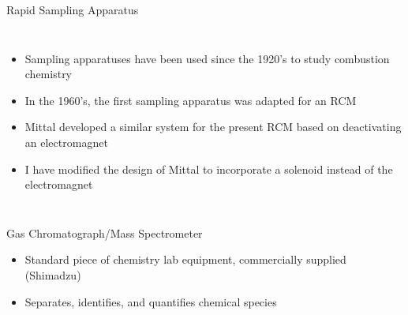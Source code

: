 \documentclass{beamer}
\begin{document}
\begin{frame}{Rapid Sampling Apparatus}
    \begin{columns}
        \begin{minipage}[c][0.6\textheight][c]{\linewidth}
            \begin{itemize}
                \item Sampling apparatuses have been used since the 1920's to study combustion chemistry
                \item<2-> In the 1960's, the first sampling apparatus was adapted for an RCM
                \item<3-> Mittal developed a similar system for the present RCM based on deactivating an electromagnet
                \item<4-> I have modified the design of Mittal to incorporate a solenoid instead of the electromagnet
            \end{itemize}
        \end{minipage}
    \end{columns}
\end{frame}

\begin{frame}{Gas Chromatograph/Mass Spectrometer}
    \begin{itemize}
        \item Standard piece of chemistry lab equipment, commercially supplied (Shimadzu)
        \item Separates, identifies, and quantifies chemical species
    \end{itemize}
\end{frame}
\end{document}

